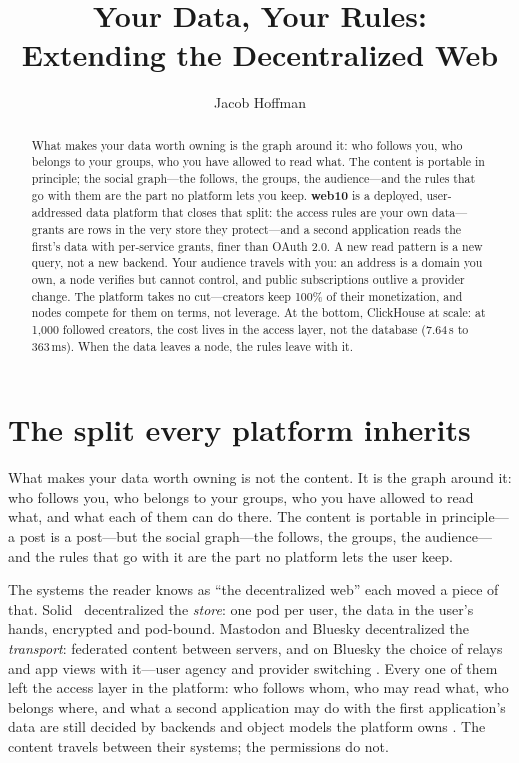 \documentclass[sigconf, nonacm]{acmart}
\title{Your Data, Your Rules: \\ Extending the Decentralized Web}
\author{Jacob Hoffman}
\affiliation{\institution{web10 Inc.}\country{}}
\begin{document}
\begin{abstract}
What makes your data worth owning is the graph around it: who follows
you, who belongs to your groups, who you have allowed to read what.
The content is portable in principle; the social graph---the follows,
the groups, the audience---and the rules that go with them are the part
no platform lets you keep. \textbf{web10} is a deployed, user-addressed
data platform that closes that split: the access rules are your own
data---grants are rows in the very store they protect---and a second
application reads the first's data with per-service grants, finer than
OAuth 2.0. A new read pattern is a new query, not a new backend. Your
audience travels with you: an address is a domain you own, a node
verifies but cannot control, and public subscriptions outlive a provider
change. The platform takes no cut---creators keep 100\% of their
monetization, and nodes compete for them on terms, not leverage. At the
bottom, ClickHouse at scale: at 1,000 followed creators, the cost lives
in the access layer, not the database (7.64\,s to 363\,ms). When the
data leaves a node, the rules leave with it.
\end{abstract}

\maketitle
\section{The split every platform inherits}
\label{sec:intro}

What makes your data worth owning is not the content. It is the graph
around it: who follows you, who belongs to your groups, who you have
allowed to read what, and what each of them can do there. The content is
portable in principle---a post is a post---but the social graph---the
follows, the groups, the audience---and the rules that go with it are
the part no platform lets the user keep.

The systems the reader knows as ``the decentralized web'' each moved a
piece of that. Solid~\cite{solid2016} decentralized the \emph{store}:
one pod per user, the data in the user's hands, encrypted and
pod-bound. Mastodon and Bluesky decentralized the \emph{transport}:
federated content between servers, and on Bluesky the choice of relays
and app views with it---user agency and provider switching
\cite{kleppmann2024}. Every one of them left the access layer in the
platform: who follows whom, who may read what, who belongs where, and
what a second application may do with the first application's data are
still decided by backends and object models the platform owns
\cite{activitypub2018}. The content travels between their systems; the
permissions do not.
\end{document}
